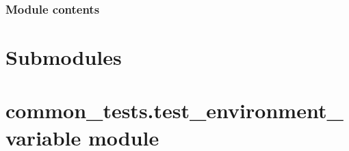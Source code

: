 \documentclass[letterpaper,10pt,english]{sphinxmanual}
\begin{document}
\subsubsection{Module contents}
\label{\detokenize{common_tests.TestInstanceLauncher:module-common_tests.TestInstanceLauncher}}\label{\detokenize{common_tests.TestInstanceLauncher:module-contents}}

\section{Submodules}
\label{\detokenize{common_tests:submodules}}

\section{common\_tests.test\_environment\_variable module}
\label{\detokenize{common_tests:module-common_tests.test_environment_variable}}\label{\detokenize{common_tests:common-tests-test-environment-variable-module}}
\end{document}
